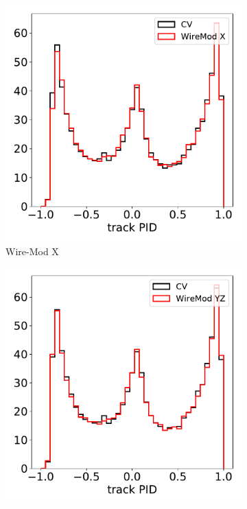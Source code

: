 \documentclass[a4paper]{article}
\begin{document}
\begin{figure}[H] 
\begin{center}
    \begin{subfigure}[b]{0.19\textwidth}
    \centering
    \includegraphics[width=1.00\textwidth]{detsys/trkpid/trkpid_03232020_WireMod_X.pdf}
    \caption{\label{fig:detsys:trkpid:WMX}Wire-Mod X}
    \end{subfigure}
    \begin{subfigure}[b]{0.19\textwidth}
    \centering
    \includegraphics[width=1.00\textwidth]{detsys/trkpid/trkpid_03232020_WireMod_YZ.pdf}

\end{subfigure}
\end{center}
\end{figure}
\end{document}

